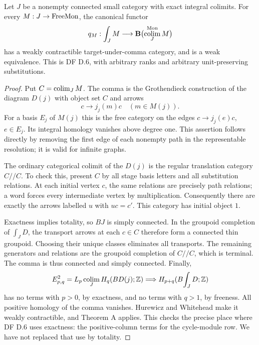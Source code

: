 \begin{proposition}
\label{G:exact}
Let $J$ be a nonempty connected small category with exact integral
colimits.  For every $M:J\to\mathrm{FreeMon}$, the canonical functor
\[
 q_M:\int_J M\longrightarrow
 \mathbf B\bigl(\operatorname*{colim}_J^{\mathrm{Mon}}M\bigr)
\]
has a weakly contractible target-under-comma category, and is a weak
equivalence.  This is DF D.6, with arbitrary ranks and arbitrary
unit-preserving substitutions.
\end{proposition}
\begin{proof}
Put $C=\operatorname*{colim}_JM$.  The comma is the Grothendieck construction of
the diagram $D(j)$ with object set $C$ and arrows
\[
 c\longrightarrow j_j(m)c\quad(m\in M(j)).
\]
For a basis $E_j$ of $M(j)$ this is the free category on the edges
$c\to j_j(e)c$, $e\in E_j$.  Its integral homology vanishes above
degree one.  This assertion follows directly by removing the first
edge of each nonempty path in the representable resolution; it is
valid for infinite graphs.

The ordinary categorical colimit of the $D(j)$ is the regular
translation category $C//C$.  To check this, present $C$ by all stage
basis letters and all substitution relations.  At each initial
vertex $c$, the same relations are precisely path relations; a word
forces every intermediate vertex by multiplication.  Consequently
there are exactly the arrows labelled $u$ with $uc=c'$.  This
category has initial object $1$.

Exactness implies totality, so $BJ$ is simply connected.  In the
groupoid completion of $\int_JD$, the transport arrows at each
$c\in C$ therefore form a connected thin groupoid.  Choosing their
unique classes eliminates all transports.  The remaining generators
and relations are the groupoid completion of $C//C$, which is
terminal.  The comma is thus connected and simply connected.
Finally,
\[
 E^2_{p,q}=L_p\operatorname*{colim}_J H_q(BD(j);\mathbb Z)
 \Longrightarrow H_{p+q}(B\!\int_JD;\mathbb Z)
\]
has no terms with $p>0$, by exactness, and no terms with $q>1$,
by freeness.  All positive homology of the comma vanishes.  Hurewicz
and Whitehead make it weakly contractible, and Theorem A applies.
This checks the precise place where DF D.6 uses exactness: the
positive-column terms for the cycle-module row.  We have not
replaced that use by totality.
\end{proof}

